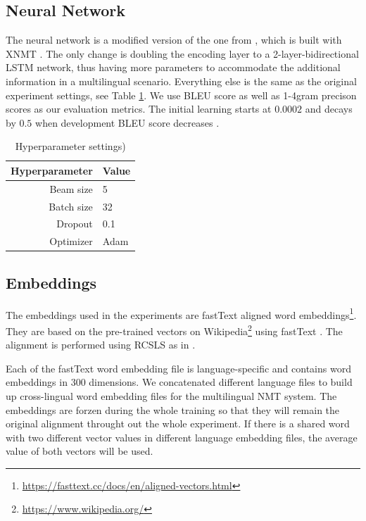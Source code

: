 \documentclass[thesis,fonts=libertine]{cluu}
\begin{document}
\subsection{Neural Network}

The neural network is a modified version of the one from \textcite{Qi:2018aa}, which is built with XNMT \textcite{Neubig:2018aa}. The only change is doubling the encoding layer to a 2-layer-bidirectional LSTM network, thus having more parameters to accommodate the additional information in a multilingual scenario. Everything else is the same as the original experiment settings, see Table \ref{table:hyperparameters}. We use BLEU score \parencite{papineni-etal-2002-bleu} as well as 1-4gram precison scores as our evaluation metrics. The initial learning starts at $0.0002$ and decays by $0.5$ when development BLEU score decreases \parencite{Denkowski:2017aa}.

\begin{table}
  \centering
  \begin{tabular}{|r|l|}
    \hline
    Hyperparameter & Value \\ [0.25ex]
    \hline\hline
    Beam size & 5 \\
    \hline
    Batch size & 32 \\ 
    \hline
    Dropout & 0.1 \\
    \hline
    Optimizer & Adam \parencite{Kingma:2014aa} \\
    \hline
  \end{tabular}
  \caption{Hyperparameter settings)}
  \label{table:hyperparameters}
\end{table}

\subsection{Embeddings}

The embeddings used in the experiments are fastText aligned word embeddings\footnote{\url{https://fasttext.cc/docs/en/aligned-vectors.html}}. They are based on the pre-trained vectors on Wikipedia\footnote{\url{https://www.wikipedia.org/}} using fastText \parencite{Bojanowski:2016aa}. The alignment is performed using RCSLS as in \textcite{Joulin:2018aa}.

Each of the fastText word embedding file is language-specific and contains word embeddings in 300 dimensions. We concatenated different language files to build up cross-lingual word embedding files for the multilingual NMT system. The embeddings are forzen during the whole training so that they will remain the original alignment throught out the whole experiment. If there is a shared word with two different vector values in different language embedding files, the average value of both vectors will be used.
\end{document}
